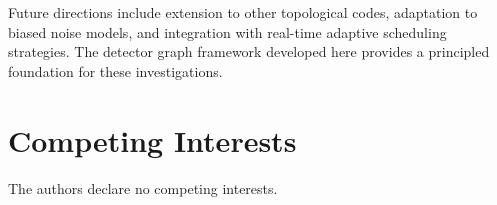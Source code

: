 \documentclass[
    reprint,
    aps,
    prx,
    superscriptaddress,
    longbibliography
]{revtex4-2}
\begin{document}
Future directions include extension to other topological codes, adaptation to biased noise models, and integration with real-time adaptive scheduling strategies. The detector graph framework developed here provides a principled foundation for these investigations.

\begin{acknowledgments}
\end{acknowledgments}

\section*{Competing Interests}
The authors declare no competing interests.


\end{document}
